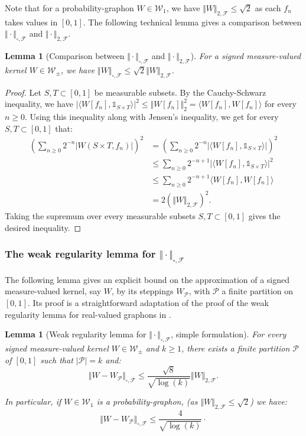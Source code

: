 \documentclass{amsart}
\theoremstyle{plain}
\newtheorem{lemme}[Th]{Lemma}
\theoremstyle{definition}
\newcommand{\signed}{\pm}
\newcommand{\cp}{\mathcal{P}}
\newcommand{\Graphon}{\mathcal{W}_1}
\newcommand{\Kernel}{\mathcal{W}_{\signed}}
\newcommand{\NcutFSymbol}{\Vert\cdot\Vert_{\square,\mathcal{F}}}
\newcommand{\F}{\mathcal{F}}
\newcommand{\norm}[1]{\Vert#1\Vert}
\begin{document}
Note that for a probability-graphon $W\in \Graphon$,
we have $\norm{W}_{2,\F}  \leq \sqrt{2}$ as  each $f_n$ takes values in $[0,1]$.
The following technical lemma gives a comparison between $\NcutFSymbol$ and $\norm{\cdot}_{2,\F}$. 

\begin{lemme}[Comparison between $\NcutFSymbol$ and $\norm{\cdot}_{2,\F}$]
	\label{lemma_ineg_norm_cut_two}
For a signed measure-valued kernel $W\in \Kernel$,
we have $\norm{W}_{\square,\F} \leq \sqrt{2} \norm{W}_{2,\F}$.
\end{lemme}

\begin{proof}
Let $S,T \subset [0,1]$ be measurable subsets.
By the Cauchy-Schwarz inequality, we have
$\vert \langle W[f_n], \mathds{1}_{S\times T} \rangle \vert^2
\leq \norm{W[f_n]}_2^2 = \langle W[f_n], W[f_n] \rangle $
for every $n\geq 0$.
Using this inequality along with Jensen's inequality, 
	we get for every $S,T\subset [0,1]$ that:
\begin{align*} 
\left( \sum_{n\geq 0} 2^{-n} \vert  W(S\times T,f_n) \vert \right)^2
& = 
 \left( \sum_{n\geq 0} 2^{-n} \vert \langle W[f_n], \mathds{1}_{S\times T} \rangle \vert \right)^2 \\
& \leq \sum_{n\geq 0} 2^{-n+1} \vert \langle W[f_n], \mathds{1}_{S\times T} \rangle \vert^2 \\
& \leq \sum_{n\geq 0} 2^{-n+1} \langle W[f_n], W[f_n] \rangle  \\
& = 2 (\norm{W}_{2,\F})^2		.
\end{align*}
Taking the supremum over every measurable subsets $S,T \subset [0,1]$
gives the desired inequality.
\end{proof}


\subsubsection{The weak regularity lemma for \texorpdfstring{$\NcutFSymbol$}{}}
\label{subsection_WRL_dcutF}

The following lemma gives an explicit bound on the approximation of a signed measure-valued
kernel, say $W$, 
by its steppings $W_\cp$, with $\cp$ a finite partition on $[0, 1]$.
Its proof  is a straightforward adaptation of the proof of the weak regularity lemma 
for real-valued graphons in \cite[Lemma~9.9]{Lovasz}. 


\begin{lemme}[Weak regularity lemma for $\NcutFSymbol$, simple formulation]\label{Regularity_Lemma}
For every signed measure-valued kernel $W\in \Kernel$ and $k\geq 1$,
there exists a finite partition $\mathcal{P}$ of $[0,1]$
such that $|\cp|=k$ and:
\[
  \norm{W - W_\mathcal{P}}_{\square,\F} 
\leq \frac{\sqrt{8}}{\sqrt{\log(k)}} \norm{W}_{2,\F}
 . \]

In particular, if $W\in \Graphon$ is a probability-graphon, 
(as $\norm{W}_{2,\F}\leq \sqrt{2}$) we have:
\[
  \norm{W - W_\mathcal{P}}_{\square,\F} 
\leq \frac{4}{\sqrt{\log(k)}}
 \cdot \]
\end{lemme}
\end{document}
